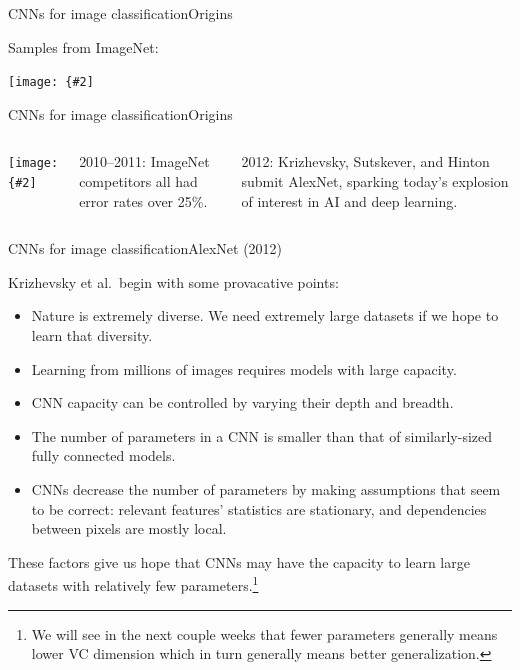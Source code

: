 \documentclass{beamer}
\newcommand{\myfig}[3]{\centerline{\texttt{[image: \{\#2]}}}
\begin{document}
\begin{frame}{CNNs for image classification}{Origins}

  Samples from ImageNet:

  \medskip

  \myfig{2.8in}{image-net}{\url{http://image-net.org/explore}}
  
\end{frame}


\begin{frame}{CNNs for image classification}{Origins}

  \begin{columns}

    \column{2.3in}

    \myfig{2.1in}{quartz-imagenet}{\begin{minipage}{2.3in} \url{https://qz.com/1034972/the-data-that-\\changed-the-direction-of-ai-research-\\and-possibly-the-world/} \end{minipage}}

    \column{2.2in}
    
    2010--2011: ImageNet competitors all had error rates over 25\%.

    \medskip

    2012: Krizhevsky, Sutskever, and Hinton submit
    \alert{AlexNet},
    sparking today's explosion of interest in AI and deep learning.

  \end{columns}
  
\end{frame}


\begin{frame}{CNNs for image classification}{AlexNet (2012)}

  Krizhevsky et al.\ begin with some provacative points:
  \begin{itemize}
    \item Nature is extremely diverse. We need \alert{extremely large
      datasets} if we hope to learn that diversity.
    \item Learning from millions of images requires \alert{models with
      large capacity}.
    \item CNN capacity can be controlled by varying their depth and breadth.
    \item The number of parameters in a CNN is smaller than that of
      similarly-sized fully connected models.
    \item CNNs decrease the number of parameters by making assumptions
      that seem to be correct: relevant features' statistics are
      stationary, and dependencies between pixels are mostly local.
  \end{itemize}

  These factors give us hope that CNNs may have the capacity to learn
  large datasets with relatively few parameters.\footnote{We will see
    in the next couple weeks that
    fewer parameters generally means lower VC dimension which in turn
    generally means better generalization.}

\end{frame}
\end{document}
